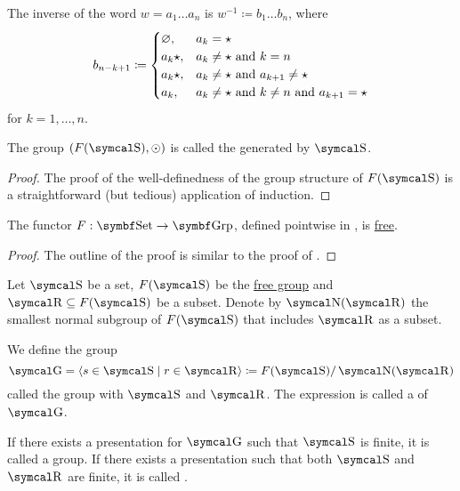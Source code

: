 \begin{definition}
  The inverse of the word \( w = a_1 \ldots a_n \) is \( w^{-1} \coloneqq b_1 \ldots b_n \), where
   \begin{equation}\label{eq:def:free_group/inverse}
     b_{n-k+1} \coloneqq \begin{cases}
       \varnothing, &a_k = {\star} \\
       a_k{\star},  &a_k \neq {\star} \text{ and } k = n \\
       a_k{\star},  &a_k \neq {\star} \text{ and } a_{k+1} \neq {\star} \\
       a_k,         &a_k \neq {\star} \text{ and } k \neq n \text{ and } a_{k+1} = {\star} \\
     \end{cases}
   \end{equation}
   for \( k = 1, \ldots, n \).

  The group \( (F(\CS), \odot) \) is called the  generated by \( \CS \).
\end{definition}
\begin{proof}
  The proof of the well-definedness of the group structure of \( F(\CS) \) is a straightforward (but tedious) application of induction\IND.
\end{proof}

\begin{proposition}\label{thm:free_group_is_free_functor}
  The functor \( F: \Cat{Set} \to \Cat{Grp} \), defined pointwise in , is \hyperref[def:free_functor]{free}.
\end{proposition}
\begin{proof}
  The outline of the proof is similar to the proof of .
\end{proof}

\begin{definition}\label{def:group_presentation}
  Let \( \CS \) be a set, \( F(\CS) \) be the \hyperref[def:free_group]{free group} and \( \CR \subseteq F(\CS) \) be a subset. Denote by \( \CN(\CR) \) the smallest normal subgroup of \( F(\CS) \) that includes \( \CR \) as a subset.

  We define the group
  \begin{equation}\label{def:group_presentation/presentation}
    \CG = \Gen{s \in \CS \mid r \in \CR} \coloneqq F(\CS) / \CN(\CR)
  \end{equation}
  called the group with  \( \CS \) and  \( \CR \). The expression  is called a  of \( \CG \).

  If there exists a presentation for \( \CG \) such that \( \CS \) is finite, it is called a  group. If there exists a presentation such that both \( \CS \) and \( \CR \) are finite, it is called .
\end{definition}

